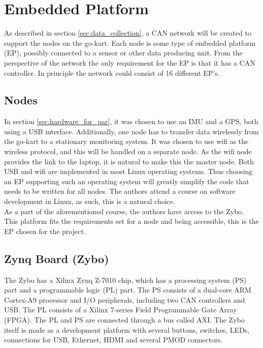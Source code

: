 
\section{Embedded Platform}\label{sec:EP}
As described in section \ref{sec:data_collection}, a CAN network will be created to support the nodes on the go-kart.
Each node is some type of embedded platform (EP), possibly connected to a sensor or other data producing unit.
From the perspective of the network the only requirement for the EP is that it has a CAN controller.
In principle the network could consist of 16 different EP's.
\subsection{Nodes}
In section \ref{sec:hardware_for_par}, it was chosen to use an IMU and a GPS, both using a USB interface.
Additionally, one node has to transfer data wirelessly from the go-kart to a stationary monitoring system.
It was chosen to use wifi as the wireless protocol, and this will be handled on a separate node.
As the wifi node provides the link to the laptop, it is natural to make this the master node.
Both USB and wifi are implemented in most Linux operating systems.
Thus choosing an EP supporting such an operating system will greatly simplify the code that needs to be written for all nodes.
The authors attend a course on software development in Linux, as such, this is a natural choice.
\\
As a part of the aforementioned course, the authors have access to the Zybo.
This platform fits the requirements set for a node and being accessible, this is the EP chosen for the project.

\subsection{Zynq Board (Zybo)}
The Zybo has a Xilinx Zynq Z-7010 chip, which has a processing system (PS) part and a programmable logic (PL) part.
The PS consists of a dual-core ARM Cortex-A9 processor and I/O peripherals, including two CAN controllers and USB.
The PL consists of a Xilinx 7-series Field Programmable Gate Array (FPGA). 
The PL and PS are connected through a bus called AXI.
The Zybo itself is made as a development platform with several buttons, switches, LEDs, connections for USB, Ethernet, HDMI and several PMOD connectors.
